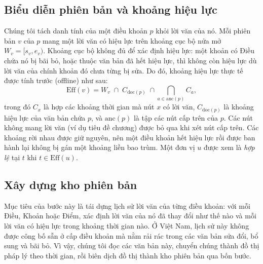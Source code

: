 \documentclass[11pt,a4paper]{article}
\begin{document}
\subsection{Biểu diễn phiên bản và khoảng hiệu lực}
Chúng tôi tách danh tính của một điều khoản $p$ khỏi lời văn của nó. Mỗi phiên bản $v$ của $p$ mang một lời văn có hiệu lực trên khoảng cục bộ nửa mở $W_v=[s_v,e_v)$. Khoảng cục bộ không đủ để xác định hiệu lực: một khoản có Điều chứa nó bị bãi bỏ, hoặc thuộc văn bản đã hết hiệu lực, thì không còn hiệu lực dù lời văn của chính khoản đó chưa từng bị sửa. Do đó, khoảng hiệu lực thực tế được tính trước (offline) như sau:
\begin{equation}
\mathrm{Eff}(v)=W_v\;\cap\;C_{\mathrm{doc}(p)}\;\cap\bigcap_{a\in\mathrm{anc}(p)}C_a ,
\label{eq:eff}
\end{equation}
trong đó $C_x$ là hợp các khoảng thời gian mà nút $x$ có lời văn, $C_{\mathrm{doc}(p)}$ là khoảng hiệu lực của văn bản chứa $p$, và $\mathrm{anc}(p)$ là tập các nút cấp trên của $p$. Các nút không mang lời văn (ví dụ tiêu đề chương) được bỏ qua khi xét nút cấp trên. Các khoảng rời nhau được giữ nguyên, nên một điều khoản hết hiệu lực rồi được ban hành lại không bị gán một khoảng liền bao trùm. Một đơn vị $u$ được xem là \emph{hợp lệ} tại $t$ khi $t\in\mathrm{Eff}(u)$.

\subsection{Xây dựng kho phiên bản}
Mục tiêu của bước này là tái dựng lịch sử lời văn của từng điều khoản: với mỗi Điều, Khoản hoặc Điểm, xác định lời văn của nó đã thay đổi như thế nào và mỗi lời văn có hiệu lực trong khoảng thời gian nào. Ở Việt Nam, lịch sử này không được công bố sẵn ở cấp điều khoản mà nằm rải rác trong các văn bản sửa đổi, bổ sung và bãi bỏ. Vì vậy, chúng tôi đọc các văn bản này, chuyển chúng thành đồ thị pháp lý theo thời gian, rồi biên dịch đồ thị thành kho phiên bản qua bốn bước.
\end{document}
